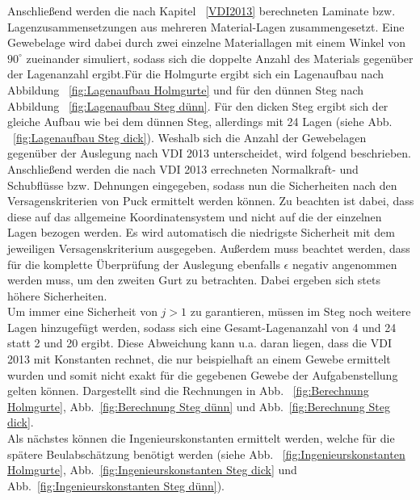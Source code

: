 \noindent Anschließend werden die nach Kapitel ~\ref{VDI2013} berechneten Laminate bzw. Lagenzusammensetzungen aus mehreren Material-Lagen zusammengesetzt. Eine Gewebelage wird dabei durch zwei einzelne Materiallagen mit einem Winkel von $90^{\circ}$ zueinander simuliert, sodass sich die doppelte Anzahl des Materials gegenüber der Lagenanzahl ergibt.Für die Holmgurte ergibt sich ein Lagenaufbau nach Abbildung ~\ref{fig:Lagenaufbau Holmgurte} und für den dünnen Steg nach Abbildung ~\ref{fig:Lagenaufbau Steg dünn}. Für den dicken Steg ergibt sich der gleiche Aufbau wie bei dem dünnen Steg, allerdings mit 24 Lagen (siehe Abb. ~\ref{fig:Lagenaufbau Steg dick}). Weshalb sich die Anzahl der Gewebelagen gegenüber der Auslegung nach VDI 2013 unterscheidet, wird folgend beschrieben.\\ 

\noindent Anschließend werden die nach VDI 2013 errechneten Normalkraft- und Schubflüsse bzw. Dehnungen eingegeben, sodass nun die Sicherheiten nach den Versagenskriterien von Puck ermittelt werden können. Zu beachten ist dabei, dass diese auf das allgemeine Koordinatensystem und nicht auf die der einzelnen Lagen bezogen werden. Es wird automatisch die niedrigste Sicherheit mit dem jeweiligen Versagenskriterium ausgegeben. Außerdem muss beachtet werden, dass für die komplette Überprüfung der Auslegung ebenfalls $\epsilon$ negativ angenommen werden muss, um den zweiten Gurt zu betrachten. Dabei ergeben sich stets höhere Sicherheiten.\\

\noindent Um immer eine Sicherheit von $j>1$ zu garantieren, müssen im Steg noch weitere Lagen hinzugefügt werden, sodass sich eine Gesamt-Lagenanzahl von 4 und 24 statt 2 und 20 ergibt. Diese Abweichung kann u.a. daran liegen, dass die VDI 2013 mit Konstanten rechnet, die nur beispielhaft an einem Gewebe ermittelt wurden und somit nicht exakt für die gegebenen Gewebe der Aufgabenstellung gelten können.
Dargestellt sind die Rechnungen in Abb. ~\ref{fig:Berechnung Holmgurte}, Abb.~\ref{fig:Berechnung Steg dünn} und Abb.~\ref{fig:Berechnung Steg dick}.\\

\noindent Als nächstes können die Ingenieurskonstanten ermittelt werden, welche für die spätere Beulabschätzung benötigt werden (siehe Abb. ~\ref{fig:Ingenieurskonstanten Holmgurte}, Abb.~\ref{fig:Ingenieurskonstanten Steg dick} und Abb.~\ref{fig:Ingenieurskonstanten Steg dünn}).